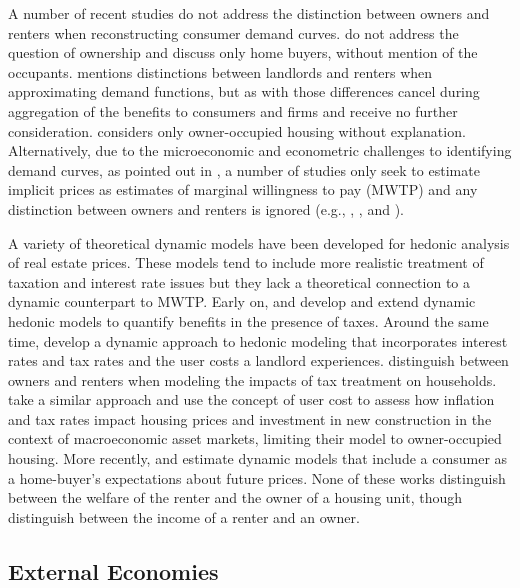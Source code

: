 \documentclass[ecta,nameyear,draft]{econsocart}
\theoremstyle{plain}
\theoremstyle{remark}
\begin{document}
A number of recent studies do not address the distinction between owners and renters when reconstructing consumer demand curves. \cite{bishoptimmins18} do not address the question of ownership and discuss only home buyers, without mention of the occupants. \cite{banzhaf20} mentions distinctions between landlords and renters when approximating demand functions, but as with \cite{freeman14} those differences cancel during aggregation of the benefits to consumers and firms and receive no further consideration. \cite{banzhaf21} considers only owner-occupied housing without explanation. Alternatively, due to the microeconomic and econometric challenges to identifying demand curves, as pointed out in \cite{bishoptimmins18}, a number of studies only seek to estimate implicit prices as estimates of marginal willingness to pay (MWTP) and any distinction between owners and renters is ignored (e.g., \cite{bajari12}, \cite{bui03}, and \cite{kuminoffpope14}).

A variety of theoretical dynamic models have been developed for hedonic analysis of real estate prices. These models tend to include more realistic treatment of taxation and interest rate issues but they lack a theoretical connection to a dynamic counterpart to MWTP. Early on, \cite{niskanen77} and \cite{freeman80} develop and extend dynamic hedonic models to quantify benefits in the presence of taxes. Around the same time, \cite{sonstelie80} develop a dynamic approach to hedonic modeling that incorporates interest rates and tax rates and the user costs a landlord experiences. \cite{hendershott83} distinguish between owners and renters when modeling the impacts of tax treatment on households. \cite{poterba84} take a similar approach and use the concept of user cost to assess how inflation and tax rates impact housing prices and investment in new construction in the context of macroeconomic asset markets, limiting their model to owner-occupied housing. More recently, \cite{bishop11} and \cite{bishop19} estimate dynamic models that include a consumer as a home-buyer's expectations about future prices. None of these works distinguish between the welfare of the renter and the owner of a housing unit, though \cite{hendershott83} distinguish between the income of a renter and an owner. 





\subsection{External Economies} 
\end{document}
